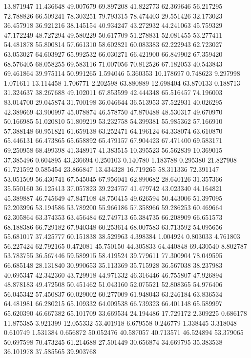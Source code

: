 13.871947
11.436648
49.007679
69.897208
41.822773
62.369646
56.217295
72.788826
66.509241
78.303251
79.793315
78.474403
29.551426
32.173023
36.457918
36.921216
38.145154
40.934247
43.272932
44.241063
45.759329
47.172249
48.727294
49.580229
50.617709
51.278831
52.081455
53.277411
54.481878
55.800814
57.661310
58.602821
60.083383
62.222943
62.723027
63.053027
64.603927
65.992532
66.030271
66.421900
66.849902
67.359420
68.576405
68.058255
69.583116
71.007056
70.812526
67.182053
40.543843
69.461864
39.975114
50.991265
1.594046
5.360353
10.178697
0.748623
9.297998
1.071611
13.114458
1.706771
2.202598
63.880889
12.698404
63.870133
0.188713
31.324637
38.267688
49.102011
67.853599
42.444348
65.516457
74.196003
83.014700
29.045874
31.700198
36.046644
36.513953
37.522931
40.026295
42.389669
43.900997
45.078874
46.578750
47.870488
48.530317
49.670970
50.166985
51.020810
51.809219
53.232758
54.399381
55.985362
57.166910
57.388148
60.951821
61.659138
63.252471
64.196124
64.338074
63.610870
65.446131
66.473865
65.658892
65.479157
67.904423
67.471400
69.583171
69.250958
68.499398
41.348917
41.383515
10.395523
56.562839
10.369015
37.385496
0.604895
43.236694
0.250103
0.140780
1.183788
0.295380
21.827908
61.721592
0.585454
23.866847
13.434328
16.719265
58.311336
72.391147
53.051509
56.430741
67.545045
67.956041
62.890682
28.640126
31.357366
35.550160
36.125413
37.057823
39.224757
41.479742
43.023340
44.164821
45.389887
46.745649
47.847108
48.750415
49.626594
50.443006
51.397095
52.203996
53.194586
53.789200
55.966186
57.358966
59.286253
60.469664
62.305864
63.374353
63.456484
62.749713
65.384735
66.208909
66.651573
68.188386
66.729182
67.940348
60.253614
68.007583
63.713592
54.095656
55.681017
37.425777
60.151838
38.529963
4.398384
1.004924
0.803033
4.761803
56.227424
62.792165
0.472081
45.750150
44.305833
64.440848
69.430540
8.802787
53.783755
36.567446
59.589915
58.419524
39.779611
77.300904
78.049595
66.685148
28.131840
30.990653
35.113369
35.715928
36.567038
38.237983
40.695347
42.342360
43.729918
44.971332
46.316446
46.755807
47.926894
48.878183
49.472508
50.451462
51.043160
52.075521
52.808365
54.976406
56.045342
57.450837
60.029002
60.277009
61.948043
63.246184
63.836534
64.481981
66.280215
65.109332
64.009538
66.739323
66.401148
65.589997
65.620390
46.667382
65.101709
33.669534
24.194486
17.729172
2.309225
0.686178
11.875385
3.921399
12.055332
53.401918
6.679558
0.246779
1.338445
3.318048
0.610749
1.531384
0.656872
50.052476
40.587057
40.713571
46.524894
53.379065
50.697598
70.473245
61.214688
27.501449
30.656874
34.669795
35.383538
36.101978
37.585565
39.903768
